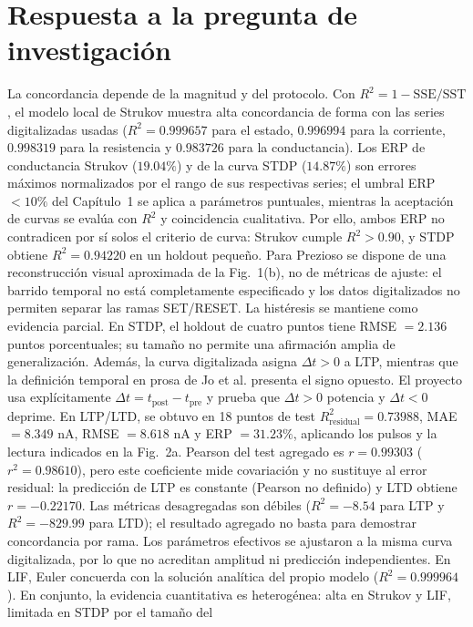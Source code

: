 \section{Respuesta a la pregunta de investigación}
\label{sec:respuesta_pregunta}

La concordancia depende de la magnitud y del protocolo. Con
$R^2=1-\mathrm{SSE}/\mathrm{SST}$, el modelo local de Strukov muestra alta
concordancia de forma con las series digitalizadas usadas ($R^2=0.999657$
para el estado, $0.996994$ para la corriente, $0.998319$ para la
resistencia y $0.983726$ para la conductancia). Los ERP de conductancia
Strukov ($19.04\%$) y de la curva STDP ($14.87\%$) son errores máximos
normalizados por el rango de sus respectivas series; el umbral ERP
$<10\%$ del Capítulo~1 se aplica a parámetros puntuales, mientras la
aceptación de curvas se evalúa con $R^2$ y coincidencia cualitativa.
Por ello, ambos ERP no contradicen por sí solos el criterio de curva:
Strukov cumple $R^2>0.90$, y STDP obtiene $R^2=0.94220$ en un holdout
pequeño. Para Prezioso se dispone de una reconstrucción visual aproximada
de la Fig.~1(b), no de métricas de ajuste: el barrido temporal no está
completamente especificado y los datos digitalizados no permiten separar
las ramas SET/RESET. La histéresis se mantiene como evidencia parcial.
En STDP, el holdout de cuatro puntos tiene RMSE $=2.136$ puntos
porcentuales; su tamaño no permite una afirmación amplia de
generalización. Además, la curva digitalizada asigna $\Delta t>0$ a LTP,
mientras que la definición temporal en prosa de Jo et al. presenta el
signo opuesto. El proyecto usa explícitamente
$\Delta t=t_{\mathrm{post}}-t_{\mathrm{pre}}$ y prueba que $\Delta t>0$
potencia y $\Delta t<0$ deprime.
En LTP/LTD, se obtuvo en 18 puntos de test
$R^2_{\mathrm{residual}}=0.73988$, MAE $=8.349$ nA,
RMSE $=8.618$ nA y ERP $=31.23\%$, aplicando los pulsos y la lectura
indicados en la Fig.~2a. Pearson del test agregado es $r=0.99303$
($r^2=0.98610$), pero este coeficiente mide covariación y no sustituye
al error residual: la predicción de LTP es constante (Pearson no
definido) y LTD obtiene $r=-0.22170$. Las métricas desagregadas son débiles
($R^2=-8.54$ para LTP y $R^2=-829.99$ para LTD); el resultado agregado
no basta para demostrar concordancia por rama. Los parámetros efectivos
se ajustaron a la misma curva digitalizada, por lo que no acreditan
amplitud ni predicción independientes. En LIF, Euler
concuerda con la solución analítica del propio modelo
($R^2=0.999964$). En conjunto, la evidencia cuantitativa es
heterogénea: alta en Strukov y LIF, limitada en STDP por el tamaño del

